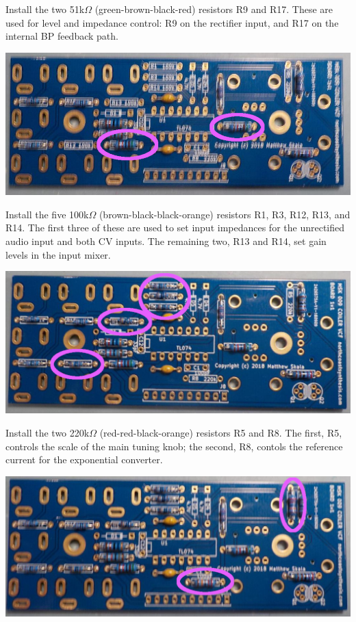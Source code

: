 Install the two 51k$\Omega$ (green-brown-black-red) resistors R9 and R17. 
These are used for level and impedance control:  R9 on the rectifier input,
and R17 on the internal BP feedback path.

\nopagebreak
\noindent\includegraphics[width=\linewidth]{res-51k.jpg}

Install the five 100k$\Omega$ (brown-black-black-orange) resistors R1, R3,
R12, R13, and R14.  The first three of these are used to set input
impedances for the unrectified audio input and both CV inputs.  The
remaining two, R13 and R14, set gain levels in the input mixer.

\nopagebreak
\noindent\includegraphics[width=\linewidth]{res-100k1.jpg}

\pagebreak

Install the two 220k$\Omega$ (red-red-black-orange) resistors R5 and R8. 
The first, R5, controls the scale of the main tuning knob; the
second, R8, contols the reference current for the exponential converter.

\nopagebreak
\noindent\includegraphics[width=\linewidth]{res-220k1.jpg}

